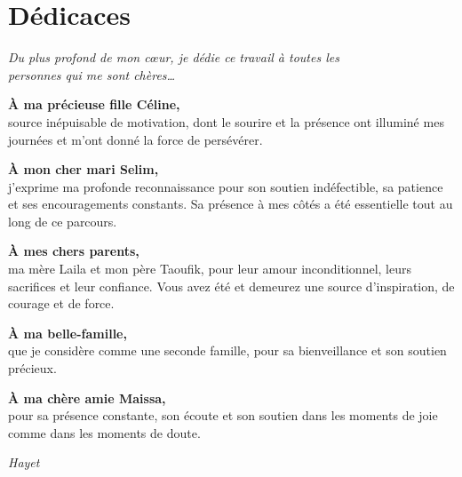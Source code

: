 \chapter*{Dédicaces}
\thispagestyle{empty}

\begin{center}
\textit{Du plus profond de mon cœur, je dédie ce travail à toutes les\\
personnes qui me sont chères\ldots}
\end{center}

\vspace{1cm}

\noindent\textbf{À ma précieuse fille Céline,}\\
source inépuisable de motivation, dont le sourire et la présence ont illuminé mes
journées et m'ont donné la force de persévérer.

\vspace{0.8cm}

\noindent\textbf{À mon cher mari Selim,}\\
j'exprime ma profonde reconnaissance pour son soutien indéfectible, sa patience et
ses encouragements constants. Sa présence à mes côtés a été essentielle tout au long
de ce parcours.

\vspace{0.8cm}

\noindent\textbf{À mes chers parents,}\\
ma mère Laila et mon père Taoufik, pour leur amour inconditionnel, leurs sacrifices
et leur confiance. Vous avez été et demeurez une source d'inspiration, de courage et
de force.

\vspace{0.8cm}

\noindent\textbf{À ma belle-famille,}\\
que je considère comme une seconde famille, pour sa bienveillance et son soutien
précieux.

\vspace{0.8cm}

\noindent\textbf{À ma chère amie Maissa,}\\
pour sa présence constante, son écoute et son soutien dans les moments de joie
comme dans les moments de doute.

\vspace{2cm}
\begin{flushright}
\textit{Hayet}
\end{flushright}
